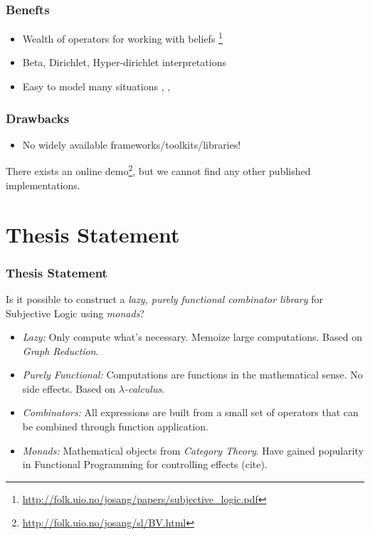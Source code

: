 \documentclass{beamer}
\begin{document}

\begin{frame}
\frametitle{Benefts}

\begin{itemize}
  \item Wealth of operators for working with beliefs
     \footnote{\url{http://folk.uio.no/josang/papers/subjective_logic.pdf}}
  \item Beta, Dirichlet, Hyper-dirichlet interpretations
  \item Easy to model many situations
    \cite{josang2008conditional}, \cite{josang2006trust}, \cite{kent2010application}
\end{itemize}

\end{frame}


\begin{frame}
\frametitle{Drawbacks}

\begin{itemize}
  \item No widely available frameworks/toolkits/libraries!
\end{itemize}

There exists an online demo\footnote{\url{http://folk.uio.no/josang/sl/BV.html}},
but we cannot find any other published implementations.

\end{frame}

%
%

\section{Thesis Statement}

\begin{frame}
\frametitle{Thesis Statement}

Is it possible to construct a \emph{lazy, purely functional combinator library} for Subjective
Logic using \emph{monads}?

\begin{itemize}
  \item \emph{Lazy:} Only compute what's necessary. Memoize large computations. Based
    on \emph{Graph Reduction}.
  \item \emph{Purely Functional:} Computations are functions in the mathematical sense.
    No side effects. Based on \emph{$\lambda$-calculus}.
  \item \emph{Combinators:} All expressions are built from a small set of operators that
    can be combined through function application.
  \item \emph{Monads:} Mathematical objects from \emph{Category Theory}. Have gained
    popularity in Functional Programming for controlling effects (cite).
\end{itemize}

\end{frame}
\end{document}
